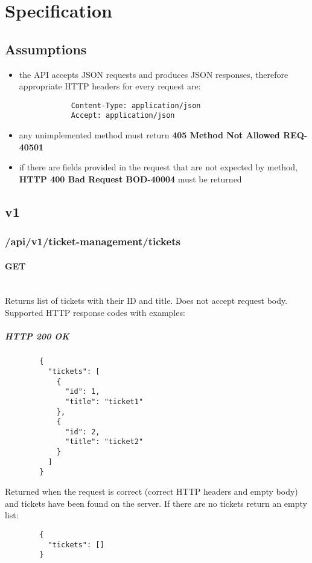 \documentclass[a4paper]{article}
\newcommand{\newLineParagraph}[1]{\paragraph{#1}\mbox{}\\}
\begin{document}
    \section{Specification}

    \subsection{Assumptions}
    \begin{itemize}
        \item the API accepts JSON requests and produces JSON responses, therefore appropriate HTTP headers for every request are:
        \begin{verbatim}
            Content-Type: application/json
            Accept: application/json
        \end{verbatim}
        \item any unimplemented method must return \textbf{405 Method Not Allowed REQ-40501}
        \item if there are fields provided in the request that are not expected by method, \textbf{HTTP 400 Bad Request BOD-40004} must be returned
    \end{itemize}

    \subsection{v1}
    \subsubsection{/api/v1/ticket-management/tickets}
    \newLineParagraph{GET}
    Returns list of tickets with their ID and title. Does not accept request body. \\
    Supported HTTP response codes with examples:
    \subparagraph{HTTP 200 OK}
    \begin{verbatim}
        {
          "tickets": [
            {
              "id": 1,
              "title": "ticket1"
            },
            {
              "id": 2,
              "title": "ticket2"
            }
          ]
        }
    \end{verbatim}
    Returned when the request is correct (correct HTTP headers and empty body) and tickets have been found on the server. If there are no tickets return an empty list:
    \begin{verbatim}
        {
          "tickets": []
        }
    \end{verbatim}
\end{document}
